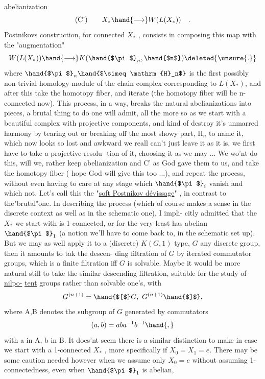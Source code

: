 
abelianization
\[ \text{(C')} \qquad X_{*} \hand{\longrightarrow} W(L(X_{*})) \quad . \]
Postnikovs construction, for connected $X_{*}$ , consists in composing
this map with the "augmentation"
\[ W(L(X_{*})) \hand{\longrightarrow} K(\hand{$\pi$}_n,\hand{$n$}) \deleted{\unsure{.}} \]
\hand{(}where $\hand{$\pi$}_n\hand{$\simeq \mathrm{H}_n$}$ is the first possibly non trivial homology module of the
chain complex corresponding to $L(X_{*})$\hand{)}, and after this  take the homotopy
fiber, and iterate (the homotopy fiber will be n-connected now). This
process, in a way, breaks the natural abelianizations  into
pieces, a  brutal thing to do one will admit, all the more so as
we start with a beautiful complex with projective components, and kind
of destroy it's unmarred harmony by tearing out or breaking off the most
showy part, $\mathrm{H}_n$ to name it, which now looks so lost and awkward we reall
can't just leave it as it is, we first have to take a projective resolu-%
tion of it, choosing it as we may ...  We wo'nt do  this, will we, 
rather keep abelianization and \hand{(}C'\hand{)} as God gave them to us, and take the
homotopy fiber ( hope God will give this too ...), and repeat the
process, without even having to care at any stage which $\hand{$\pi$}_i$ vanish and
which not. Let's call this the "\uline{soft Postnikov dévissage}" , in contrast
to the"brutal"one. In describing the process (which of course makes a
sense in the discrete context as well as in the schematic one), I impli-%
citly admitted that the $X_{*}$ we start with is 1-connected, or for the
very least has abelian $\hand{$\pi$}_1$ (a notion we'll have to come back to, in the
schematic  set up). But we may as well apply it to a (discrete)
$K(G,1)$ type, $G$ any discrete group, then it amounts to tak the descen-%
ding filtration of $G$ by iterated commutator groups, which is a finite
filtration iff $G$ is solvable. Maybe it would be more natural still to
take the similar descending filtration, suitable for the study of \uline{nilpo-}%
\uline{tent} groups rather than solvable one's, with
\[ G^{(n+1)} = \hand{$[$}G,\ G^{(n+1)}\hand{$]$}, \]
where \hand{$[$}A,B\hand{$]$} denotes the subgroup of $G$ generated by commutators 
\[ (a,b) = aba^{-1}b^{-1}\hand{,} \]
with a in A, b in B. It does'nt seem there is a similar distinction to
make in case we start with a  1-connected $X_{*}$ , more specifically
if $X_0=X_1= e$. There may be some  caution needed however when we assume
only $X_0= e$ without assuming 1-connectedness, even when $\hand{$\pi$}_1$ is abelian,


